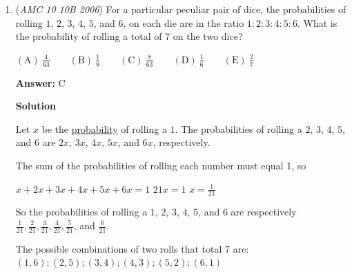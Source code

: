 \begin{enumerate}
 $AB = \sqrt{(2006-6)^2 + (178-(-22))^2} = \sqrt{(2000)^2 + (200)^2 } = 200\sqrt{101}$ 

 Now we can look at the answer choices. Because all of them are integers, then we know that $AD$ has to also contain $\sqrt{101}$ to ensure that $AB*AD$ is an integer. Once you know that, you can guarantee that the answer must be a multiple of 101. (If you're wondering why there can't be a fraction like $1/101$, there can't because $y$ is an integer the number under the square root in $AD$, is an integer.) Having that information narrows down the answer choices to just $(B)$ $4040$, and $(E)$ $40400$.

 Looking back at what we found for $AB$, which is $200\sqrt{101}$, and what we know about $AD$, that it has to contain $\sqrt{101}$. we know that the answer is at least $200\sqrt{101}*\sqrt{101}=20200$, which is already greater than answer choice $(B)$, which is $4040$. From this, we can conclude that the answer is $\boxed{\textbf{(E) }  40400}$



	\item (\textit{AMC 10 10B 2006}) For a particular peculiar pair of dice, the probabilities of rolling $1$, $2$, $3$, $4$, $5$, and $6$, on each die are in the ratio $1:2:3:4:5:6$. What is the probability of rolling a total of $7$ on the two dice? 


 $\mathrm{(A) \ } \frac{4}{63}\qquad \mathrm{(B) \ } \frac{1}{8}\qquad \mathrm{(C) \ } \frac{8}{63}\qquad \mathrm{(D) \ } \frac{1}{6}\qquad \mathrm{(E) \ } \frac{2}{7}$

 \textbf{Answer: }C



\textbf{Solution}

Let $x$ be the \href{https://artofproblemsolving.com/wiki/index.php?title=Probability}{probability} of rolling a $1$. The probabilities of rolling a $2$, $3$, $4$, $5$, and $6$ are $2x$, $3x$, $4x$, $5x$, and $6x$, respectively.

 The sum of the probabilities of rolling each number must equal 1, so

 $x+2x+3x+4x+5x+6x=1$
$21x=1$
$x=\frac{1}{21}$

 So the probabilities of rolling a $1$, $2$, $3$, $4$, $5$, and $6$ are respectively $\frac{1}{21}, \frac{2}{21}, \frac{3}{21}, \frac{4}{21}, \frac{5}{21}$, and $\frac{6}{21}$. 

 The possible combinations of two rolls that total $7$ are: $(1,6) ; (2,5) ; (3,4) ; (4,3) ; (5,2) ; (6,1)$


\end{enumerate}

